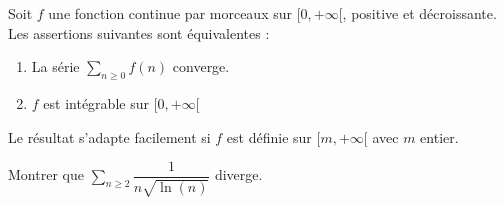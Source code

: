 \documentclass[french,11pt,twoside]{VcCours}
\newcommand{\Sum}[2]{\sum_{#1}^{#2}}
\begin{document}
\begin{Theoreme}{} Soit $f$ une fonction continue par morceaux sur $[0,+ \infty[$, positive et décroissante. Les assertions suivantes sont équivalentes :

\begin{enumerate}
\item La série $\Sum{n \geq 0}{} f(n)$ converge.
\item $f$ est intégrable sur $[0, + \infty[$
\end{enumerate}
\end{Theoreme}

\begin{Remarque}{} Le résultat s'adapte facilement si $f$ est définie sur $[m, + \infty[$ avec $m$ entier.
\end{Remarque} 

\begin{Demonstration}{}

\newpage

\vspace*{8cm}
\end{Demonstration}

\begin{ApplicationDirecte}{} Montrer que $\Sum{n \geq 2}{} \dfrac{1}{n \sqrt{\ln(n)}}$ diverge.
\end{ApplicationDirecte}
\end{document}
